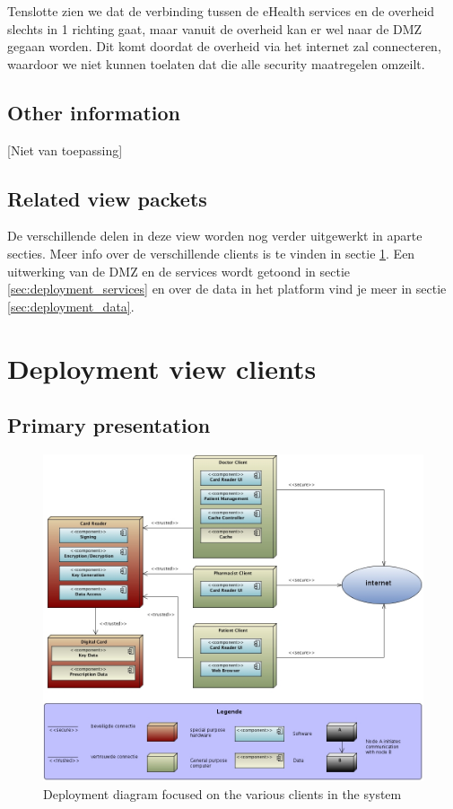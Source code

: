 \documentclass[a4paper,10pt]{article}
\begin{document}
Tenslotte zien we dat de verbinding tussen de eHealth services en de overheid slechts in 1 richting gaat, maar vanuit de overheid kan er wel naar de DMZ gegaan worden. Dit komt doordat de overheid via het internet zal connecteren, waardoor we niet kunnen toelaten dat die alle security maatregelen omzeilt.

\subsection{Other information}
[Niet van toepassing]

\subsection{Related view packets}

De verschillende delen in deze view worden nog verder uitgewerkt in aparte secties. Meer info over de verschillende clients is te vinden in sectie \ref{sec:deployment_clients}. Een uitwerking van de DMZ en de services wordt getoond in sectie \ref{sec:deployment_services} en over de data in het platform vind je meer in sectie \ref{sec:deployment_data}.

\clearpage
\section{Deployment view clients}
\label{sec:deployment_clients}

\subsection{Primary presentation}
\begin{center}
    \begin{figure}[!h]
      \includegraphics[width=\textwidth]{../images/deployment_clients.jpg}
	\caption{Deployment diagram focused on the various clients in the system}
    \end{figure}
  \end{center}
\end{document}
